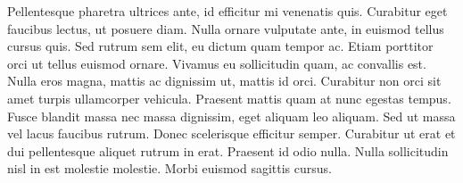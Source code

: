 Pellentesque pharetra ultrices ante, id efficitur mi venenatis quis. Curabitur eget faucibus lectus, ut posuere diam. Nulla ornare vulputate ante, in euismod tellus cursus quis. Sed rutrum sem elit, eu dictum quam tempor ac. Etiam porttitor orci ut tellus euismod ornare. Vivamus eu sollicitudin quam, ac convallis est. Nulla eros magna, mattis ac dignissim ut, mattis id orci. Curabitur non orci sit amet turpis ullamcorper vehicula. Praesent mattis quam at nunc egestas tempus. Fusce blandit massa nec massa dignissim, eget aliquam leo aliquam. Sed ut massa vel lacus faucibus rutrum. Donec scelerisque efficitur semper. Curabitur ut erat et dui pellentesque aliquet rutrum in erat. Praesent id odio nulla. Nulla sollicitudin nisl in est molestie molestie. Morbi euismod sagittis cursus.
